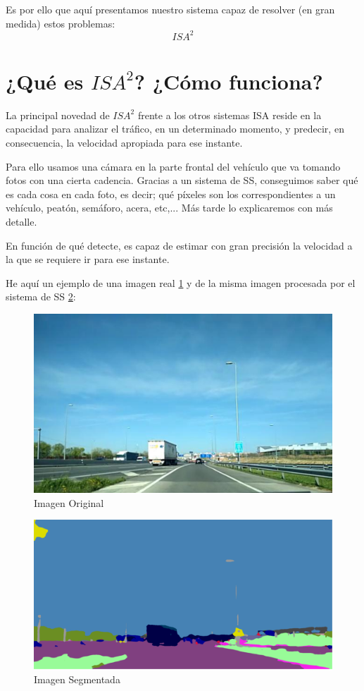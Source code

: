 Es por ello que aquí presentamos nuestro sistema capaz de resolver (en gran medida) estos problemas: \[ISA^{2}\]


\section{¿Qué es $ISA^{2}$? ¿Cómo funciona?}


La principal novedad de $ISA^{2}$ frente a los otros sistemas \ac{ISA} reside en la capacidad para analizar el tráfico, en un determinado momento, y predecir, en consecuencia, la velocidad apropiada para ese instante.


Para ello usamos una cámara en la parte frontal del vehículo que va tomando fotos con una cierta cadencia. Gracias a un sistema de \ac{SS}, conseguimos saber qué es cada cosa en cada foto, es decir; qué píxeles son los correspondientes a un vehículo, peatón, semáforo, acera, etc,... Más tarde lo explicaremos con más detalle.


En función de qué detecte, es capaz de estimar con gran precisión la velocidad a la que se requiere ir para ese instante.


He aquí un ejemplo de una imagen real \ref{fig:ImgOrig} y de la misma imagen procesada por el sistema de \ac{SS} \ref{fig:ImgSegm}:

\begin{figure}[h]
  \centering
  \includegraphics[width=12cm]{Figuras/Imagen_Original.eps}
  \caption{Imagen Original}
  \label{fig:ImgOrig}
\end{figure}

\begin{figure}[h]
  \centering
  \includegraphics[width=12cm]{Figuras/Ejemplo_Imagen_Segmentada.eps}
  \caption{Imagen Segmentada}
    \label{fig:ImgSegm}
\end{figure}


